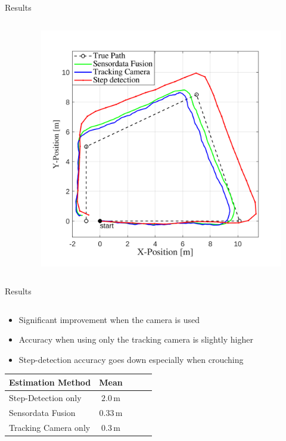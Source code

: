 \documentclass[aspectratio=169,handout]{beamer}
\begin{document}
{\begin{frame}{Results}
\begin{columns}
\begin{column}{0.45\textwidth}
			\end{column}
			\begin{column}{0.54\textwidth}
				\begin{figure}
					\centering
					\includegraphics[width=0.9\linewidth]{../Conference_Paper/Path2}
				\end{figure}
				
			\end{column}
			
			
			
		\end{columns}
	\end{frame}
	
		
		\begin{frame}{Results}
		\begin{columns}
			\begin{column}{0.45\textwidth}
				\begin{itemize}
					\item Significant improvement when the camera is used
					\item Accuracy when using only the tracking camera is slightly higher %
					\item Step-detection accuracy goes down especially when crouching
				\end{itemize}
				
					\begin{tabular}{lcccc}
					\toprule
					\textbf{Estimation Method}                  &   \textbf{Mean}      \\ \midrule
					Step-Detection only                              & $2.0\,\mathrm{m}$   \\
					Sensordata Fusion                           & $0.33\,\mathrm{m}$   \\
					Tracking Camera only & $0.3\,\mathrm{m}$  \\ \bottomrule
				\end{tabular}


\end{column}
\end{columns}
\end{frame}}
\end{document}
